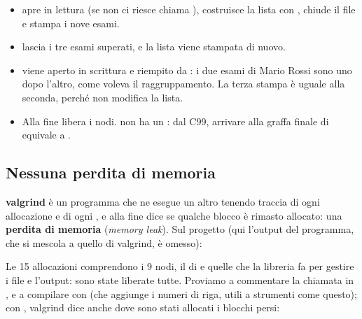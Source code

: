 \begin{itemize}
  \item {} apre  in lettura (se non ci riesce chiama
        ), costruisce la lista con ,
        chiude il file e stampa i nove esami.
  \item {} lascia i tre esami superati, e la
        lista viene stampata di nuovo.
  \item {} viene aperto in scrittura e riempito da
        : i due esami di Mario Rossi sono uno dopo l'altro,
        come voleva il raggruppamento. La terza stampa è uguale alla
        seconda, perché  non modifica la lista.
  \item Alla fine  libera i nodi.  non ha un
        : dal C99, arrivare alla graffa finale di 
        equivale a .
\end{itemize}

\subsection{Nessuna perdita di memoria}

\textbf{valgrind} è un programma che ne esegue un altro tenendo traccia di
ogni allocazione e di ogni , e alla fine dice se qualche blocco è
rimasto allocato: una \textbf{perdita di memoria} (\textit{memory leak}). Sul
progetto (qui l'output del programma, che si mescola a quello di valgrind, è
omesso):


Le 15 allocazioni comprendono i 9 nodi, il  di
 e quelle che la libreria fa per gestire i file e l'output:
sono state liberate tutte. Proviamo a commentare la chiamata
 in , e a compilare con 
(che aggiunge i numeri di riga, utili a strumenti come questo); con
, valgrind dice anche dove sono stati allocati i
blocchi persi:

